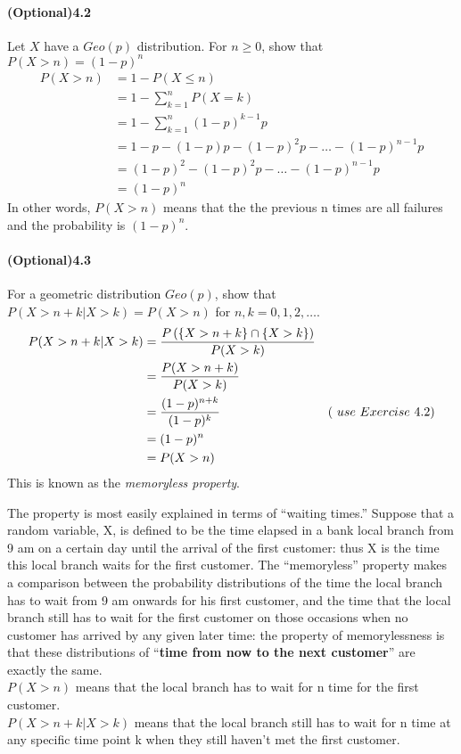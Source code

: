 \documentclass[11pt]{article} %
\begin{document}
\paragraph*{(Optional)4.2} Let $X$ have a $Geo(p)$ distribution. For $n \geq 0$, show that $P(X > n) = (1-p)^n$
\begin{align*}
P( X > n) &  = 1 - P(X \leq n) \\
& = 1 - \sum_{k=1}^n P(X=k) \\
& = 1 - \sum_{k=1}^n (1-p)^{k-1}p \\
& = 1 - p - (1-p)p - (1-p)^2p - \ldots - (1-p)^{n-1}p \\
& = (1-p)^2 - (1-p)^2p - \ldots - (1-p)^{n-1}p \\
& = (1-p)^n 
\end{align*}
In other words, $P(X>n)$ means that the the previous n times are all failures and the probability is $(1-p)^n$. 

\paragraph*{(Optional)4.3} For a geometric distribution $Geo(p)$, show that $P(X> n + k | X > k) = P(X > n)$ for $n, k = 0, 1, 2, \ldots$. 
\begin{align*}
P(X> n + k | X > k) & = \frac{P \left( \{X > n + k\}\cap \{X > k\}\right) }{P(X > k)} & \\
& = \frac{P(X > n + k)}{P(X > k)} & \\
& = \frac{(1-p)^{n+k}}{(1-p)^k}& \text(\ use\  Exercise\ 4.2) \\
& = (1-p)^n & \\
& = P(X>n)
\end{align*}
This is known as the {\it memoryless property}. 

The property is most easily explained in terms of ``waiting times.'' Suppose that a random variable, X, is defined to be the time elapsed in a bank local branch from 9 am on a certain day until the arrival of the first customer: thus X is the time this local branch waits for the first customer. The ``memoryless'' property makes a comparison between the probability distributions of the time the local branch has to wait from 9 am onwards for his first customer, and the time that the local branch still has to wait for the first customer on those occasions when no customer has arrived by any given later time: the property of memorylessness is that these distributions of ``{\bf time from now to the next customer}'' are exactly the same. \\
$P(X > n)$ means that the local branch has to wait for n time for the first customer. \\
$P(X > n + k | X > k)$ means that the local branch still has to wait for n time at any specific time point k when they still haven't met the first customer. 
\end{document}
